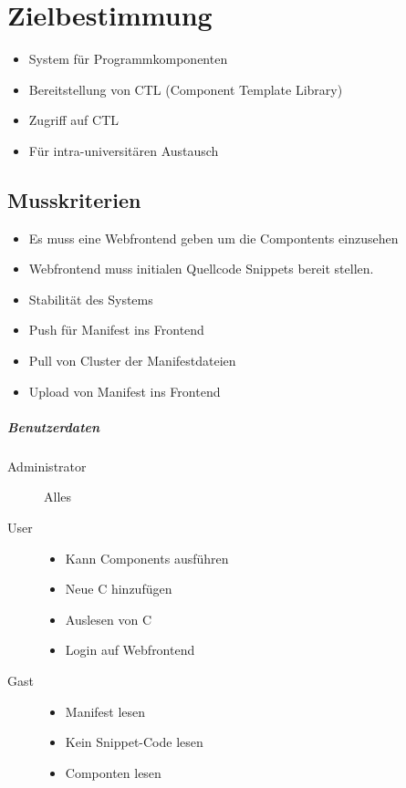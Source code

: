
\chapter{Zielbestimmung}

\begin{itemize}
\item  System für Programmkomponenten
\item  Bereitstellung von CTL (Component Template Library)
\item  Zugriff auf CTL
\item  Für intra-universitären Austausch
\end{itemize}

\section{Musskriterien}

\begin{itemize}
\item  Es muss eine Webfrontend geben um die Compontents einzusehen
\item  Webfrontend muss initialen Quellcode Snippets bereit stellen.
\item  Stabilität des Systems
\item  Push für Manifest ins Frontend
\item  Pull von Cluster der Manifestdateien
\item  Upload von Manifest ins Frontend
\end{itemize}

\paragraph{Benutzerdaten}

\begin{description}
	\item[Administrator] Alles
	\item[User]
		\begin{itemize}
			\item Kann Components ausführen
			\item Neue C hinzufügen
			\item Auslesen von C
			\item Login auf Webfrontend
		\end{itemize}
	\item[Gast] 
		\begin{itemize}
			\item Manifest lesen
			\item Kein Snippet-Code lesen
			\item Componten lesen
		\end{itemize}
\end{description}

